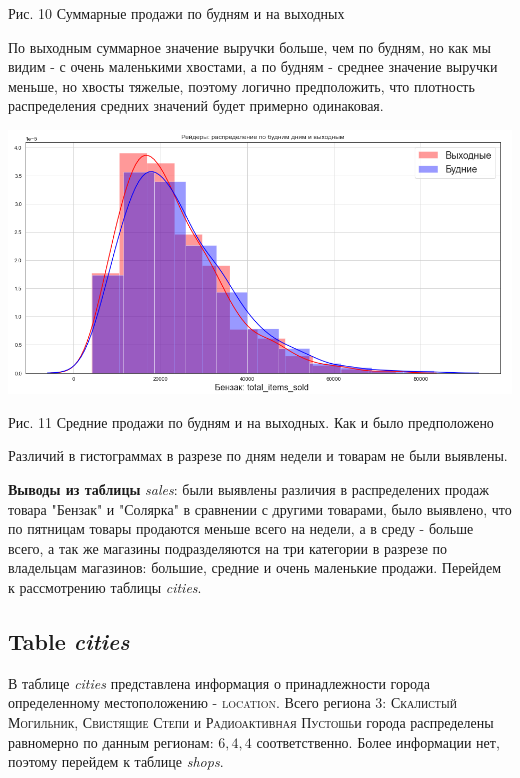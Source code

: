 \documentclass[%
10pt, %
final, %
oneside, %
onecolumn, %
centertags]{article} %
\theoremstyle{plain}
\theoremstyle{definition}
\theoremstyle{remark}
\begin{document}
\begin{itemize}
\begin{center}
 	Рис. 10 Суммарные продажи по будням и на выходных
	\end{center}

	По выходным суммарное значение выручки больше, чем по будням, но как мы видим - с очень маленькими хвостами, а по будням - среднее значение выручки меньше, но хвосты тяжелые, поэтому логично предположить, что плотность распределения средних значений будет примерно одинаковая.

	\begin{center}
	\includegraphics[scale=0.35]{11.png}

 	Рис. 11 Средние продажи по будням и на выходных. Как и было предположено
	\end{center}

	Различий в гистограммах в разрезе по дням недели и товарам не были выявлены.
\end{itemize}

\textbf{Выводы из таблицы} \textit{sales}: были выявлены различия в распределених продаж товара "Бензак" и "Солярка" в сравнении с другими товарами, было выявлено, что по пятницам товары продаются меньше всего на недели, а в среду - больше всего, а так же магазины подразделяются на три категории в разрезе по владельцам магазинов: большие, средние и очень маленькие продажи. Перейдем к рассмотрению таблицы \textit{cities}.

\subsection{Table \textit{cities}}

В таблице \textit{cities} представлена информация о принадлежности города определенному местоположению - \textsc{location}. Всего региона $3$: \textsc{Скалистый Могильник, Свистящие Степи и Радиоактивная Пустошь}и города распределены равномерно по данным регионам: $6, 4, 4$ соответственно. Более информации нет, поэтому перейдем к таблице \textit{shops}.
\end{document}
